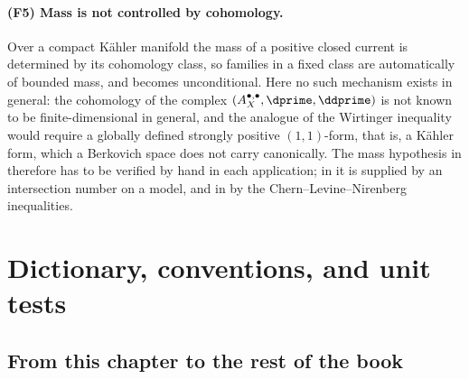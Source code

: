 \paragraph{(F5) Mass is not controlled by cohomology.}
Over a compact K\"ahler manifold the mass of a positive closed current is
determined by its cohomology class, so families in a fixed class are
automatically of bounded mass, and 
becomes unconditional.  Here no such mechanism exists in general: the
cohomology of the complex $(A_X^{\bullet,\bullet},\dprime,\ddprime)$ is not
known to be finite-dimensional in general, and the analogue of the Wirtinger
inequality would require a globally defined strongly positive
$(1,1)$-form, that is, a K\"ahler form, which a Berkovich space does not
carry canonically.  The mass hypothesis in
 therefore has to be verified by hand in
each application; in  it is supplied by an intersection
number on a model, and in  by the
Chern--Levine--Nirenberg inequalities.

\section{Dictionary, conventions, and unit tests}
\label{sec:ch14-dictionary}

\subsection{From this chapter to the rest of the book}
\label{sec:ch14-dict-forward}

